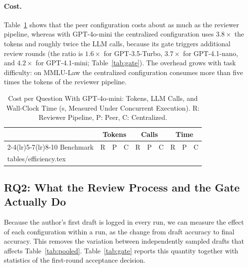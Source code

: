 \documentclass[lettersize,journal]{IEEEtran}
\makeatletter
\newcommand{\tabinput}[1]{\@@input #1 }
\makeatother
\begin{document}
\paragraph{Cost.}
Table~\ref{tab:efficiency} shows that the peer configuration costs about as much as the reviewer pipeline, whereas with GPT-4o-mini the centralized configuration uses \(3.8\times\) the tokens and roughly twice the LLM calls, because its gate triggers additional review rounds (the ratio is \(1.6\times\) for GPT-3.5-Turbo, \(3.7\times\) for GPT-4.1-nano, and \(4.2\times\) for GPT-4.1-mini; Table~\ref{tab:gate}).
The overhead grows with task difficulty: on MMLU-Law the centralized configuration consumes more than five times the tokens of the reviewer pipeline.

\begin{table}[!t]
\caption{Cost per Question With GPT-4o-mini: Tokens, LLM Calls, and Wall-Clock Time (s, Measured Under Concurrent Execution). R: Reviewer Pipeline, P: Peer, C: Centralized.}
\label{tab:efficiency}
\centering
\footnotesize
\setlength{\tabcolsep}{2.5pt}
\begin{tabular}{l rrr rrr rrr}
\toprule
 & \multicolumn{3}{c}{Tokens} & \multicolumn{3}{c}{Calls} & \multicolumn{3}{c}{Time} \\
\cmidrule(lr){2-4}\cmidrule(lr){5-7}\cmidrule(lr){8-10}
Benchmark & R & P & C & R & P & C & R & P & C \\
\midrule
\tabinput{tables/efficiency.tex}
\bottomrule
\end{tabular}
\end{table}

\subsection{RQ2: What the Review Process and the Gate Actually Do}
\label{sec:gate_results}

Because the author's first draft is logged in every run, we can measure the effect of each configuration within a run, as the change from draft accuracy to final accuracy. This removes the variation between independently sampled drafts that affects Table~\ref{tab:pooled}.
Table~\ref{tab:gate} reports this quantity together with statistics of the first-round acceptance decision.
\end{document}
